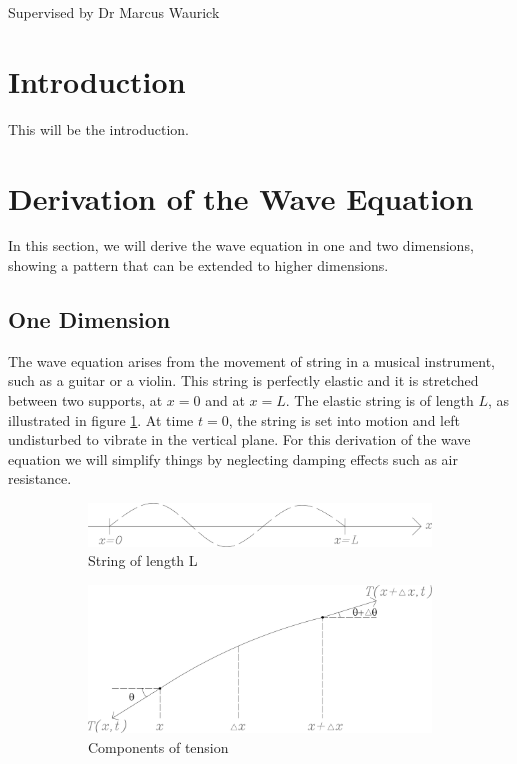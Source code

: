 \documentclass[12pt]{article}
\numberwithin{equation}{section}
\begin{document}
    \vspace*{5cm}
    Supervised by Dr Marcus Waurick
    \newpage
    \normalsize
    \tableofcontents
    \newpage
    
    \section{Introduction}
    This will be the introduction.
    
    \section{Derivation of the Wave Equation}
    In this section, we will derive the wave equation in one and two dimensions, showing a pattern that 
can be extended to higher dimensions.

\subsection{One Dimension}
The wave equation arises from the movement of string in a musical instrument, such as a guitar or a violin.
\cite{BoyDiP} This string is perfectly elastic and
it is stretched between two supports, at $x=0$ and at $x=L$. The elastic string is of length $L$, as
illustrated in figure \ref{fig:1a}. At time $t=0$, the string is set into motion and left undisturbed to vibrate in the
vertical plane. For this derivation of the wave equation we will simplify things by neglecting damping 
effects such as air resistance.

\begin{figure}[h]
    \begin{subfigure}[t]{0.5\textwidth} 
        \includegraphics[width=0.9\linewidth]{images/grafic-1.png} 
        \caption{String of length L}
        \label{fig:1a}
    \end{subfigure}
    \begin{subfigure}[t]{0.5\textwidth}
        \includegraphics[width=0.9\linewidth]{images/grafic-2.png}
        \caption{Components of tension}
        \label{fig:1b}
    \end{subfigure}     
\caption{}
\label{fig:1}
\end{figure}
\end{document}
